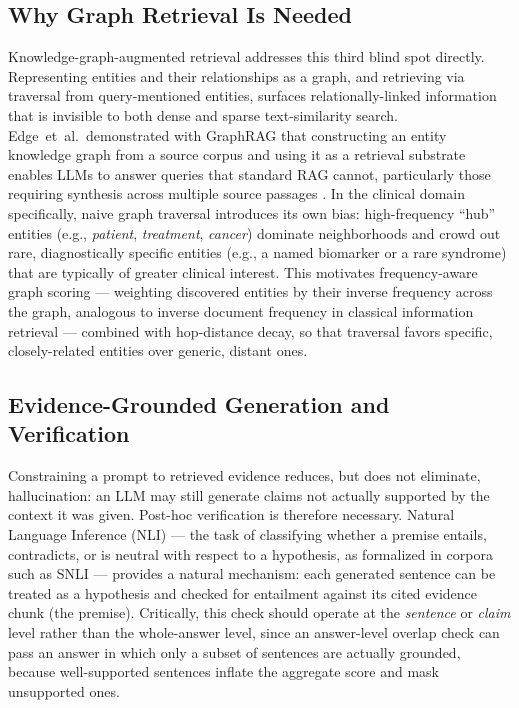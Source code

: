 \documentclass[conference]{IEEEtran}
\begin{document}
\subsection{Why Graph Retrieval Is Needed}
Knowledge-graph-augmented retrieval addresses this third blind spot directly. Representing entities and their relationships as a graph, and retrieving via traversal from query-mentioned entities, surfaces relationally-linked information that is invisible to both dense and sparse text-similarity search. Edge~et~al.\ demonstrated with GraphRAG that constructing an entity knowledge graph from a source corpus and using it as a retrieval substrate enables LLMs to answer queries that standard RAG cannot, particularly those requiring synthesis across multiple source passages \cite{edge2024graphrag}. In the clinical domain specifically, naive graph traversal introduces its own bias: high-frequency ``hub'' entities (e.g., \emph{patient}, \emph{treatment}, \emph{cancer}) dominate neighborhoods and crowd out rare, diagnostically specific entities (e.g., a named biomarker or a rare syndrome) that are typically of greater clinical interest. This motivates frequency-aware graph scoring --- weighting discovered entities by their inverse frequency across the graph, analogous to inverse document frequency in classical information retrieval --- combined with hop-distance decay, so that traversal favors specific, closely-related entities over generic, distant ones.

\subsection{Evidence-Grounded Generation and Verification}
Constraining a prompt to retrieved evidence reduces, but does not eliminate, hallucination: an LLM may still generate claims not actually supported by the context it was given. Post-hoc verification is therefore necessary. Natural Language Inference (NLI) --- the task of classifying whether a premise entails, contradicts, or is neutral with respect to a hypothesis, as formalized in corpora such as SNLI \cite{bowman2015large} --- provides a natural mechanism: each generated sentence can be treated as a hypothesis and checked for entailment against its cited evidence chunk (the premise). Critically, this check should operate at the \emph{sentence} or \emph{claim} level rather than the whole-answer level, since an answer-level overlap check can pass an answer in which only a subset of sentences are actually grounded, because well-supported sentences inflate the aggregate score and mask unsupported ones.
\end{document}
